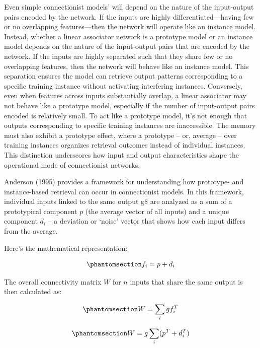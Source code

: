 \documentclass[
  letterpaper,
  11pt,
  english,
  singlespacing,
  headsepline]{MastersDoctoralThesis}
\begin{document}
Even simple connectionist models' will depend on the nature of the
input-output pairs encoded by the network. If the inputs are highly
differentiated---having few or no overlapping features---then the
network will operate like an instance model. Instead, whether a linear
associator network is a prototype model or an instance model depends on
the nature of the input-output pairs that are encoded by the network. If
the inputs are highly separated such that they share few or no
overlapping features, then the network will behave like an instance
model. This separation ensures the model can retrieve output patterns
corresponding to a specific training instance without activating
interfering instances. Conversely, even when features across inputs
substantially overlap, a linear associator may not behave like a
prototype model, especially if the number of input-output pairs encoded
is relatively small. To act like a prototype model, it's not enough that
outputs corresponding to specific training instances are inaccessible.
The memory must also exhibit a prototype effect, where a prototype --
or, average -- over training instances organizes retrieval outcomes
instead of individual instances. This distinction underscores how input
and output characteristics shape the operational mode of connectionist
networks.

Anderson (1995) provides a framework for understanding how prototype-
and instance-based retrieval can occur in connectionist models. In this
framework, individual inputs linked to the same output g\$ are analyzed
as a sum of a prototypical component \(p\) (the average vector of all
inputs) and a unique component \(d_i\) -- a deviation or `noise' vector
that shows how each input differs from the average.

Here's the mathematical representation:

\begin{equation}\phantomsection\label{eq-intro7}{
f_i = p + d_i
}\end{equation}

The overall connectivity matrix \(W\) for \(n\) inputs that share the
same output is then calculated as:

\begin{equation}\phantomsection\label{eq-intro8}{
W = \sum_i gf_i^T
}\end{equation}

\begin{equation}\phantomsection\label{eq-intro9}{
W = g \sum_i (p^T + d_i^T)
}\end{equation}
\end{document}
